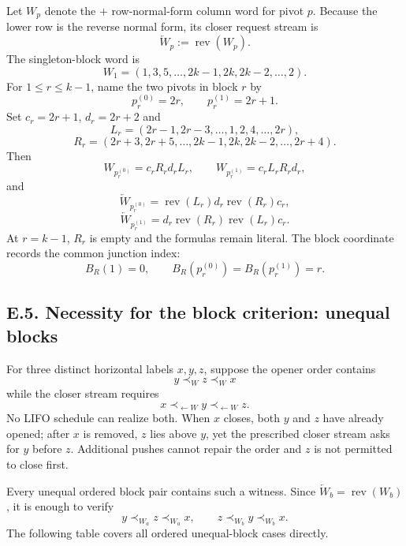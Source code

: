 \documentclass[11pt]{article}
\theoremstyle{definition}
\theoremstyle{remark}
\begin{document}
Let \(W_p\) denote the \(+\) row-normal-form column word for pivot
\(p\). Because the lower row is the reverse normal form, its closer
request stream is \[
\overleftarrow{W}_p:=\operatorname{rev}(W_p).
\] The singleton-block word is \[
W_1=(1,3,5,\ldots,2k-1,2k,2k-2,\ldots,2).
\] For \(1\le r\le k-1\), name the two pivots in block \(r\) by \[
p_r^{(0)}=2r,
\qquad
p_r^{(1)}=2r+1.
\] Set \(c_r=2r+1\), \(d_r=2r+2\) and \[
L_r=(2r-1,2r-3,\ldots,1,2,4,\ldots,2r),
\] \[
R_r=(2r+3,2r+5,\ldots,2k-1,2k,2k-2,\ldots,2r+4).
\] Then \[
W_{p_r^{(0)}}=c_rR_rd_rL_r,
\qquad
W_{p_r^{(1)}}=c_rL_rR_rd_r,
\] and \[
\overleftarrow{W}_{p_r^{(0)}}=
\operatorname{rev}(L_r)d_r\operatorname{rev}(R_r)c_r,
\] \[
\overleftarrow{W}_{p_r^{(1)}}=
d_r\operatorname{rev}(R_r)\operatorname{rev}(L_r)c_r.
\] At \(r=k-1\), \(R_r\) is empty and the formulas remain literal. The
block coordinate records the common junction index: \[
B_R(1)=0,
\qquad
B_R(p_r^{(0)})=B_R(p_r^{(1)})=r.
\]

\subsection{E.5. Necessity for the block criterion: unequal
blocks}\label{e.5.-necessity-for-the-block-criterion-unequal-blocks}

For three distinct horizontal labels \(x,y,z\), suppose the opener order
contains \[
y\prec_W z\prec_W x
\] while the closer stream requires \[
x\prec_{\leftarrow W} y\prec_{\leftarrow W} z.
\] No LIFO schedule can realize both. When \(x\) closes, both \(y\) and
\(z\) have already opened; after \(x\) is removed, \(z\) lies above
\(y\), yet the prescribed closer stream asks for \(y\) before \(z\).
Additional pushes cannot repair the order and \(z\) is not permitted to
close first.

Every unequal ordered block pair contains such a witness. Since
\(\overleftarrow{W}_b=\operatorname{rev}(W_b)\), it is enough to verify
\[
y\prec_{W_a}z\prec_{W_a}x,
\qquad
z\prec_{W_b}y\prec_{W_b}x.
\] The following table covers all ordered unequal-block cases directly.
\end{document}
